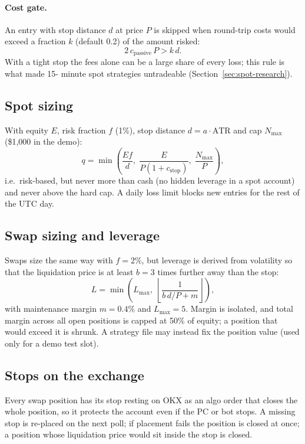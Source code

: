 \documentclass[11pt,a4paper]{article}
\begin{document}
\paragraph{Cost gate.} An entry with stop distance $d$ at price $P$ is skipped when round-trip
costs would exceed a fraction $k$ (default 0.2) of the amount risked:
\begin{equation}
2\,c_{\text{passive}}\,P > k\,d .
\end{equation}
With a tight stop the fees alone can be a large share of every loss; this rule is what made 15-
minute spot strategies untradeable (Section~\ref{sec:spot-research}).

\subsection{Spot sizing}
With equity $E$, risk fraction $f$ (1\%), stop distance $d=a\cdot\mathrm{ATR}$ and cap
$N_{\max}$ (\$1{,}000 in the demo):
\begin{equation}
q = \min\!\left(\frac{E f}{d},\; \frac{E}{P(1+c_{\text{stop}})},\; \frac{N_{\max}}{P}\right),
\end{equation}
i.e.\ risk-based, but never more than cash (no hidden leverage in a spot account) and never above
the hard cap. A daily loss limit blocks new entries for the rest of the UTC day.

\subsection{Swap sizing and leverage}
Swaps size the same way with $f=2\%$, but leverage is derived from volatility so that the
liquidation price is at least $b=3$ times further away than the stop:
\begin{equation}
L = \min\!\left(L_{\max},\; \left\lfloor \frac{1}{b\,d/P + m} \right\rfloor\right),
\end{equation}
with maintenance margin $m=0.4\%$ and $L_{\max}=5$. Margin is isolated, and total margin across
all open positions is capped at 50\% of equity; a position that would exceed it is shrunk. A
strategy file may instead fix the position value (used only for a demo test slot).

\subsection{Stops on the exchange}
Every swap position has its stop resting on OKX as an algo order that closes the whole
position, so it protects the account even if the PC or bot stops. A missing stop is re-placed on
the next poll; if placement fails the position is closed at once; a position whose liquidation
price would sit inside the stop is closed.
\end{document}
